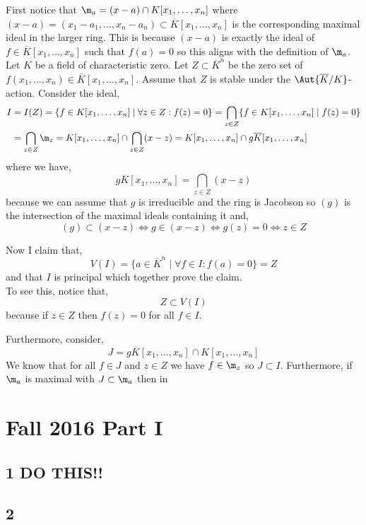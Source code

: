 \documentclass[12pt]{article}
\begin{document}
First notice that $\m_a = (x - a) \cap K[x_1, \dots, x_n]$ where $(x-a) = (x_1 - a_1, \dots, x_n - a_n) \subset \overline{K}[x_1, \dots, x_n]$ is the corresponding maximal ideal in the larger ring. This is because $(x - a)$ is exactly the ideal of $f \in \overline{K}[x_1, \dots, x_n]$ such that $f(a) = 0$ so this aligns with the definition of $\m_a$.
\bigskip\\
Let $K$ be a field of characteristic zero. Let $Z \subset \overline{K}^n$ be the zero set of $f(x_1, \dots, x_n) \in \overline{K}[x_1, \dots, x_n]$. Assume that $Z$ is stable under the $\Aut{\overline{K}/K}$-action. Consider the ideal,
\begin{align*}
I & = I(Z) = \{f \in K[x_1, \dots, x_n] \mid \forall z \in Z : f(z) = 0 \} = \bigcap_{z \in Z} \{ f \in K[x_1, \dots, x_n] \mid f(z) = 0 \} 
\\
& = \bigcap_{z \in Z} \m_z = K[x_1, \dots, x_n] \cap \bigcap_{z \in Z} (x - z) = K[x_1, \dots, x_n] \cap g \overline{K}[x_1, \dots, x_n] 
\end{align*}
where we have,
\[ g \overline{K}[x_1, \dots, x_n] = \bigcap_{z \in Z} (x - z) \]
because we can assume that $g$ is irreducible and the ring is Jacobson so $(g)$ is the intersection of the maximal ideals containing it and,
\[ (g) \subset (x - z) \iff g \in (x - z) \iff g(z) = 0 \iff z \in Z \]


Now I claim that,
\[ V(I) = \{ a \in \overline{K}^n \mid \forall f \in I : f(a) = 0 \} = Z \]
and that $I$ is principal which together prove the claim. 
\bigskip\\
To see this, notice that,
\[ Z \subset V(I) \]
because if $z \in Z$ then $f(z) = 0$ for all $f \in I$.


Furthermore, consider,
\[ J = g \overline{K}[x_1, \dots, x_n] \cap K[x_1, \dots, x_n] \]
We know that for all $f \in J$ and $z \in Z$ we have $f \in \m_z$ so $J \subset I$. Furthermore, if $\m_a$ is maximal with $J \subset \m_a$ then in

\section{Fall 2016 Part I}

\subsection{1 DO THIS!!}

\subsection{2}
\end{document}

